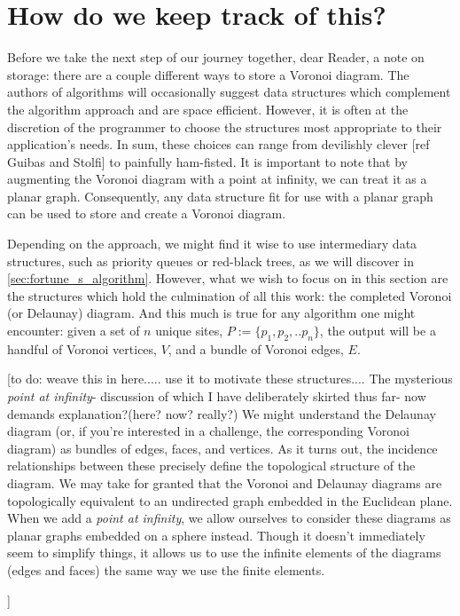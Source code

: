 \documentclass[12pt,twoside]{reedthesis}
\begin{document}
  \section{How do we keep track of this?} %
  \label{sec:how_do_we_keep_track_of_this}
    Before we take the next step of our journey together, dear Reader, a note on storage: there are a couple different ways to store a Voronoi diagram. The authors of algorithms will occasionally suggest data structures which complement the algorithm approach and are space efficient. However, it is often at the discretion of the programmer to choose the structures most appropriate to their application's needs. In sum, these choices can range from devilishly clever [ref Guibas and Stolfi] to painfully ham-fisted. It is important to note that by augmenting the Voronoi diagram with a point at infinity, we can treat it as a planar graph. Consequently, any data structure fit for use with a planar graph can be used to store and create a Voronoi diagram. \par

    Depending on the approach, we might find it wise to use intermediary data structures, such as priority queues or red-black trees, as we will discover in \cref{sec:fortune_s_algorithm}. However, what we wish to focus on in this section are the structures which hold the culmination of all this work: the completed Voronoi (or Delaunay) diagram. And this much is true for any algorithm one might encounter: given a set of $n$ unique sites, $P:=\{p_{1}, p_{2}, .. p_{n}\}$, the output will be a handful of Voronoi vertices, $V$, and a bundle of Voronoi edges, $E$. 

    [to do: weave this in here..... use it to motivate these structures.... The mysterious \emph{point at infinity}- discussion of which I have deliberately skirted thus far- now demands explanation?(here? now? really?) We might understand the Delaunay diagram (or, if you're interested in a challenge, the corresponding Voronoi diagram) as bundles of edges, faces, and vertices. As it turns out, the incidence relationships between these precisely define the topological structure of the diagram. We may take for granted that the Voronoi and Delaunay diagrams are topologically equivalent to an undirected graph embedded in the Euclidean plane. When we add a \emph{point at infinity}, we allow ourselves to consider these diagrams as planar graphs embedded on a sphere instead. Though it doesn't immediately seem to simplify things, it allows us to use the infinite elements of the diagrams (edges and faces) the same way we use the finite elements. \par]
\end{document}
